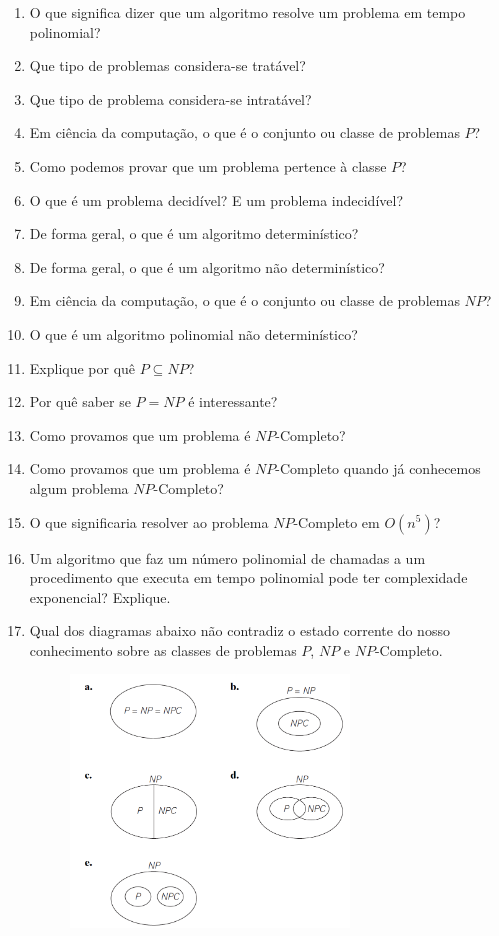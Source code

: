 \documentclass{article}
\begin{document}
\begin{enumerate}
    \item O que significa dizer que um algoritmo resolve um problema em tempo polinomial?
    \item Que tipo de problemas considera-se tratável?
    \item Que tipo de problema considera-se intratável?
    \item Em ciência da computação, o que é o conjunto ou classe de problemas $P$?
    \item Como podemos provar que um problema pertence à classe $P$?
    \item O que é um problema decidível? E um problema indecidível?
    \item De forma geral, o que é um algoritmo determinístico?
    \item De forma geral, o que é um algoritmo não determinístico?
    \item Em ciência da computação, o que é o conjunto ou classe de problemas $NP$?
    \item O que é um algoritmo polinomial não determinístico?
    \item Explique por quê $P \subseteq NP$?
    \item Por quê saber se $P=NP$ é interessante?
    \item Como provamos que um problema é $NP$-Completo?
    \item Como provamos que um problema é $NP$-Completo quando já conhecemos algum problema $NP$-Completo?
    \item O que significaria resolver ao problema $NP$-Completo em $O(n^5)$?
    \item Um algoritmo que faz um número polinomial de chamadas a um procedimento que executa em tempo polinomial pode ter complexidade exponencial? Explique.
    \item Qual dos diagramas abaixo não contradiz o estado corrente do nosso conhecimento sobre as classes de problemas $P$, $NP$ e $NP$-Completo.
        \begin{figure}[!ht]
        \centering
        \includegraphics[width=0.7\textwidth]{Capture.PNG}
        \label{fig:my_label}
    \end{figure}
    
\end{enumerate}


%
%
\end{document}
